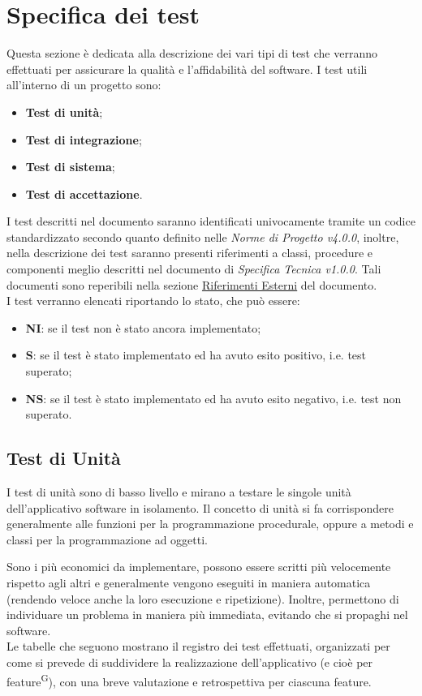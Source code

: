 \section{Specifica dei test}\label{sec:test}
\par Questa sezione è dedicata alla descrizione dei vari tipi di test che verranno effettuati per assicurare la qualità e l'affidabilità del software.
I test utili all’interno di un progetto sono:
\begin{itemize}
    \item \textbf{Test di unità};
    \item \textbf{Test di integrazione};
    \item \textbf{Test di sistema};
    \item \textbf{Test di accettazione}.
\end{itemize}
I test descritti nel documento saranno identificati univocamente tramite un codice standardizzato secondo quanto definito nelle \textit{Norme di Progetto v4.0.0}, inoltre, nella descrizione dei test saranno presenti riferimenti a classi, procedure e componenti meglio descritti nel documento di \textit{Specifica Tecnica v1.0.0}.
Tali documenti sono reperibili nella sezione \hyperref[sec:riferimenti_esterni]{Riferimenti Esterni} del documento.
\\ \noindent I test verranno elencati riportando lo stato, che può essere:
\begin{itemize}
    \item \textbf{NI}: se il test non è stato ancora implementato;
    \item \textbf{S}: se il test è stato implementato ed ha avuto esito positivo, i.e. test superato;
    \item \textbf{NS}: se il test è stato implementato ed ha avuto esito negativo, i.e. test non superato.    
\end{itemize}

\subsection{Test di Unità}
\par I test di unità sono di basso livello e mirano a testare le singole unità dell'applicativo software in isolamento. Il concetto di unità si fa corrispondere generalmente alle funzioni per la programmazione procedurale, oppure a metodi e classi per la programmazione ad oggetti.
\par Sono i più economici da implementare, possono essere scritti più velocemente rispetto agli altri e generalmente vengono eseguiti in maniera automatica (rendendo veloce anche la loro esecuzione e ripetizione). Inoltre, permettono di individuare un problema in maniera più immediata, evitando che si propaghi nel software.
\vspace{0.5cm} \\ Le tabelle che seguono mostrano il registro dei test effettuati, organizzati per come si prevede di suddividere la realizzazione dell'applicativo (e cioè per feature\textsuperscript{G}), con una breve valutazione e retrospettiva per ciascuna feature.

